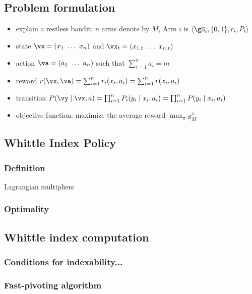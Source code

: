 \subsection{Problem formulation}
\label{subsec:restless_pb_formul}

\begin{itemize}
    \item explain a restless bandit: $n$ arms denote by $M$, Arm $i$ is $\langle\gS_i, \{0,1\}, r_i,P_i\rangle$
    \item state $\vx=(x_1\ \dots\ x_n)$ and $\vx_t=(x_{1,t}\ \dots\ x_{n,t})$
    \item action $\va=(a_1\ \dots\ a_n)$ such that $\sum_{i=1}^{n}a_i =m$
    \item reward $r(\vx, \va)=\sum_{i=1}^n r_i(x_i,a_i) =\sum_{i=1}^n r(x_i,a_i)$
    \item transition $P(\vy \mid\vx,a)=\prod_{i=1}^nP_i(y_i \mid x_i,a_i)=\prod_{i=1}^n P(y_i \mid x_i,a_i)$
    \item objective function: maximize the average reward $\max_{\pi}g^\pi_M$ 
\end{itemize}


\subsection{Whittle Index Policy}
\label{subsec:whittle_idx}

\subsubsection{Definition}

Lagrangian multipliers

\subsubsection{Optimality}

\subsection{Whittle index computation}

\subsubsection{Conditions for indexability...}

\subsubsection{Fast-pivoting algorithm}

